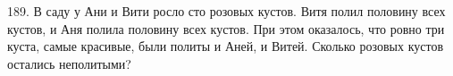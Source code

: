 189. В саду у Ани и Вити росло сто розовых кустов. Витя полил половину всех кустов, и Аня полила половину всех кустов. При этом оказалось, что ровно три куста, самые красивые, были политы и Аней, и Витей. Сколько розовых кустов остались неполитыми?\\
